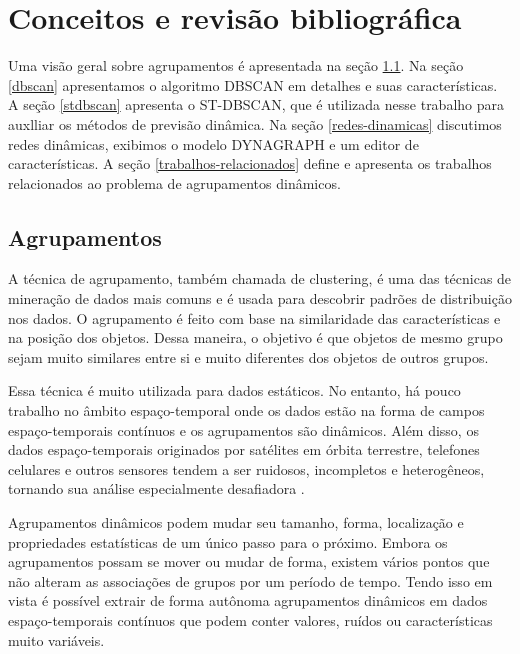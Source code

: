 \chapter{Conceitos e revisão bibliográfica}
\label{cap:estadodaarte}

Uma visão geral sobre agrupamentos é apresentada na seção \ref{agrupamentos}. Na seção \ref{dbscan} apresentamos o algoritmo DBSCAN em detalhes e suas características. A seção \ref{stdbscan} apresenta o ST-DBSCAN, que é utilizada nesse trabalho para auxlliar os métodos de previsão dinâmica. Na seção  \ref{redes-dinamicas}  discutimos redes dinâmicas, exibimos o modelo DYNAGRAPH e um editor de características. A seção  \ref{trabalhos-relacionados}  define e apresenta os trabalhos relacionados ao problema de agrupamentos dinâmicos.


\section{Agrupamentos}
\label{agrupamentos}

A técnica de agrupamento, também chamada de clustering, é uma das técnicas de mineração de dados mais comuns e é usada para descobrir padrões de distribuição nos dados. O agrupamento é feito com base na similaridade das características e na posição dos objetos. Dessa maneira, o objetivo é que objetos de mesmo grupo sejam muito similares entre si e muito diferentes dos objetos de outros grupos.

Essa técnica é muito utilizada para dados estáticos. No entanto, há pouco trabalho no âmbito espaço-temporal onde os dados estão na forma de campos espaço-temporais contínuos e os agrupamentos são dinâmicos. Além disso, os dados espaço-temporais originados por satélites em órbita terrestre, telefones celulares e outros sensores tendem a ser ruidosos, incompletos e heterogêneos, tornando sua análise especialmente desafiadora \cite{faghmous2013}.

Agrupamentos dinâmicos podem mudar seu tamanho, forma, localização e propriedades estatísticas de um único passo para o próximo. Embora os agrupamentos possam se mover ou mudar de forma, existem vários pontos que não alteram as associações de grupos por um período de tempo. Tendo isso em vista é possível extrair de forma autônoma agrupamentos dinâmicos em dados espaço-temporais contínuos que podem conter valores, ruídos ou características muito variáveis.

